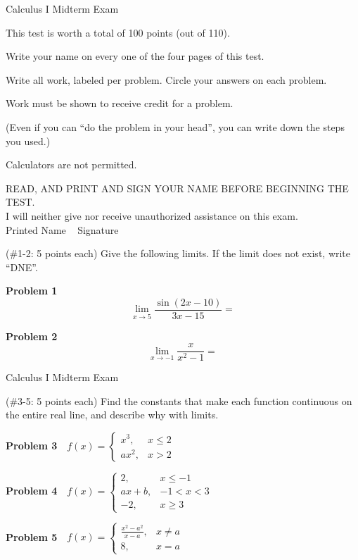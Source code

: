 \documentclass[10pt]{article}
\newcommand{\prob}[1]{\vspace{5mm} \noindent \textbf{Problem #1} \,\,}
\newcommand{\header}{\begin{center}
Calculus I Midterm Exam 
\end{center}
}
\newcommand{\intro}{
This test is worth a total of 100 points (out of 110). 

Write your name on every one of the four pages of this test. 

Write all work, labeled per problem. Circle your answers on each problem. 

Work must be shown to receive credit for a problem. 

(Even if you can ``do the problem in your head'', you can write down the steps you used.) 

Calculators are not permitted.

\bigskip

\noindent READ, AND PRINT AND SIGN YOUR NAME BEFORE BEGINNING THE TEST. \\
I will neither give nor receive unauthorized assistance on this exam. \\
Printed Name \underline{\hspace{60mm}} \,\,\, Signature \underline{\hspace{60mm}}
}
\begin{document}


\header

\intro

\vspace{20mm}

\noindent (\#1-2: 5 points each) Give the following limits. If the limit does not exist, write ``DNE''.

\prob{1} \[ \lim_{x \to 5} \frac{\sin(2x-10)}{3x-15} =  \] %

\vspace{40mm}

\prob{2} \[ \lim_{x \to -1} \frac{x}{x^2 - 1} = \] %


\pagebreak

\header 


\noindent (\#3-5: 5 points each) Find the constants that make each function continuous on the entire real line, and describe why with limits. %

\prob{3} $f(x) = \left\{ \begin{array}{ll} x^3, & x \leq 2 \\ ax^2, & x > 2 \end{array} \right.$  %

\vspace{50mm}

\prob{4} $f(x) = \left\{ \begin{array}{ll} 2, & x \leq -1 \\ ax + b, & -1 < x < 3 \\ -2, & x \geq 3 \end{array} \right.$ \\ %

\vspace{50mm}



\prob{5} $f(x) = \left\{ \begin{array}{ll} \frac{x^2 - a^2}{x - a}, & x \neq a \\ 8, & x = a \end{array} \right.$ \\ %
\end{document}
